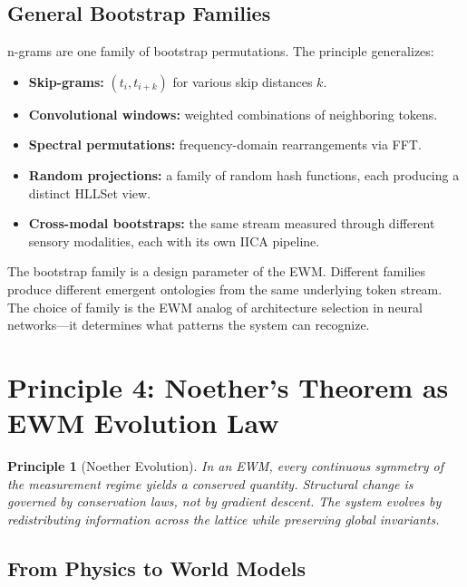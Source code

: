 \documentclass[11pt,a4paper]{article}
\newtheorem{principle}{Principle}[section]
\theoremstyle{remark}
\begin{document}
\subsection{General Bootstrap Families}

n-grams are one family of bootstrap permutations. The principle generalizes:
\begin{itemize}[leftmargin=*,nosep]
  \item \textbf{Skip-grams:} $(t_i, t_{i+k})$ for various skip distances $k$.
  \item \textbf{Convolutional windows:} weighted combinations of neighboring tokens.
  \item \textbf{Spectral permutations:} frequency-domain rearrangements via FFT.
  \item \textbf{Random projections:} a family of random hash functions, each producing
    a distinct HLLSet view.
  \item \textbf{Cross-modal bootstraps:} the same stream measured through different
    sensory modalities, each with its own IICA pipeline.
\end{itemize}

The bootstrap family is a design parameter of the EWM. Different families produce
different emergent ontologies from the same underlying token stream. The choice of
family is the EWM analog of architecture selection in neural networks---it determines
what patterns the system can recognize.

\section{Principle 4: Noether's Theorem as EWM Evolution Law}
\label{sec:noether}

\begin{principle}[Noether Evolution]
\label{prin:noether}
In an EWM, every continuous symmetry of the measurement regime yields a conserved
quantity. Structural change is governed by conservation laws, not by gradient descent.
The system evolves by redistributing information across the lattice while preserving
global invariants.
\end{principle}

\subsection{From Physics to World Models}
\end{document}
